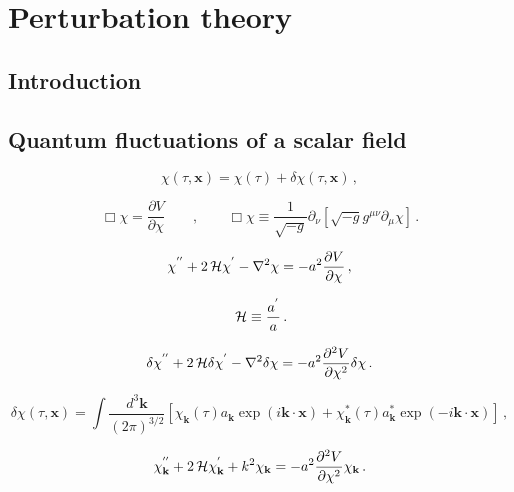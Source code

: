\chapter{Perturbation theory}
\label{chapter:3}

\section{Introduction}
\label{section:3.1}

\section{Quantum fluctuations of a scalar field}
\label{section:3.2}

\begin{equation}
\chi (\tau , \mathbf{x}) = \chi (\tau) + \delta \chi (\tau , \mathbf{x} ) \,,
\label{equation:3.2.1}
\end{equation}

\begin{equation}
\Box \chi = \dfrac{\partial V}{\partial \chi } \qquad , \qquad \Box \chi \equiv \frac{1}{\sqrt{-g}}\partial_\nu \left[ \sqrt{-g}g^{\mu\nu}\partial_\mu \chi  \right]  \, .
\label{equation:3.2.2}
\end{equation}

\begin{equation}
\chi^{''} + 2 \,{\mathcal H}\chi^{'} - \nabla^2 \chi = -a^2 \dfrac{\partial V }{\partial \chi } \, ,
\label{equation:3.2.3}
\end{equation}

\begin{equation}
\,{\mathcal H} \equiv \frac{a^{'}}{a} \, .
\label{equation:3.2.4}
\end{equation}

\begin{equation}
\delta \chi^{''} + 2\,{\mathcal H} \delta \chi^{'} - \nabla^2 \delta \chi = - a^2\dfrac{\partial^2 V}{\partial \chi^2} \delta \chi \, .
\label{equation:3.2.5}
\end{equation}

\begin{equation}
\delta \chi (\tau , \mathbf{x}) = \int \frac{d^3 \mathbf{k}}{(2\pi)^{3/2}} \left[ \chi_{\mathbf{k}} (\tau) a_{\mathbf{k}} \exp(i \mathbf{k} \cdot \mathbf{x} ) + \chi_{\mathbf{k}}^{\ast}(\tau) a_{\mathbf{k}}^{\ast} \exp(-i \mathbf{k} \cdot \mathbf{x} )    \right]\, ,
\label{equation:3.2.6}
\end{equation}

\begin{equation}
\chi^{''}_{\mathbf{k}} + 2 \,{\mathcal H} \chi^{'}_{\mathbf{k}} + k^2  \chi_{\mathbf{k}} = -a^2 \dfrac{\partial^2 V }{\partial \chi^2 }\chi_{\mathbf{k}} \, .
\label{equation:3.2.7}
\end{equation} 

